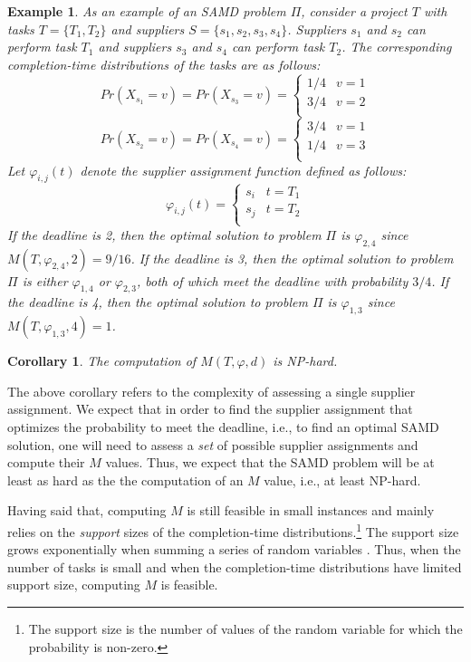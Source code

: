 \documentclass[letterpaper]{article}
\newtheorem{corollary}{Corollary}
\newtheorem{example}{Example}
\newcommand{\samd}{\ac{SAMD}\xspace}
\begin{document}
\begin{example}
As an example of an \samd problem $\Pi$, consider a project $T$ with tasks $T=\{T_1, T_2\}$ and suppliers $S=\{s_1, s_2, s_3, s_4\}$.
Suppliers $s_1$ and $s_2$ can perform task $T_1$
and suppliers $s_3$ and $s_4$ can perform task $T_2$.
The corresponding completion-time distributions of the tasks are as follows:
\[ Pr(X_{s_1}=v)=Pr(X_{s_3}=v)=
\begin{cases}
      1/4 & v=1\\
      3/4 & v=2\\
\end{cases}
\]
\[ Pr(X_{s_2}=v)=Pr(X_{s_4}=v)=
\begin{cases}
      3/4 & v=1\\
      1/4 & v=3\\
\end{cases}
\]
Let $\varphi_{i,j}(t)$ denote the supplier assignment function defined as follows:
\[\varphi_{i,j}(t)=
\begin{cases}
      s_i & t=T_1\\
      s_j & t=T_2\\
\end{cases}\]
If the deadline is 2, then the optimal solution to problem $\Pi$ is $\varphi_{2,4}$
since $M(T, \varphi_{2,4}, 2)=9/16$.
If the deadline is 3, then the optimal solution to problem $\Pi$ is either $\varphi_{1,4}$
or $\varphi_{2,3}$, both of which meet the deadline with probability $3/4$. If the deadline is 4, then the optimal solution to problem $\Pi$ is $\varphi_{1,3}$  since $M(T, \varphi_{1,3}, 4)=1$.
\end{example}







\begin{corollary}
The computation of $M(T, \varphi, d)$ is NP-hard.
\label{cor:m}
\end{corollary}
The above corollary refers to the complexity of assessing a single supplier assignment. We expect that in order to find the supplier assignment that optimizes the probability to meet the deadline, i.e., to find an optimal \samd solution, one will need to assess a \emph{set} of possible supplier assignments and compute their $M$ values. Thus, we expect that the \samd problem will be at least as hard as the the computation of an $M$ value, i.e., at least NP-hard.



Having said that, computing $M$ is still feasible in small instances and mainly relies on the \emph{support} sizes of the completion-time distributions.\footnote{The support size is the number of values of the random variable for which the probability is non-zero.} The support size grows exponentially when summing a series of random variables \cite{cohen2015estimating}. Thus, when the number of tasks is small and when the completion-time distributions have limited support size, computing $M$ is feasible.
\end{document}
